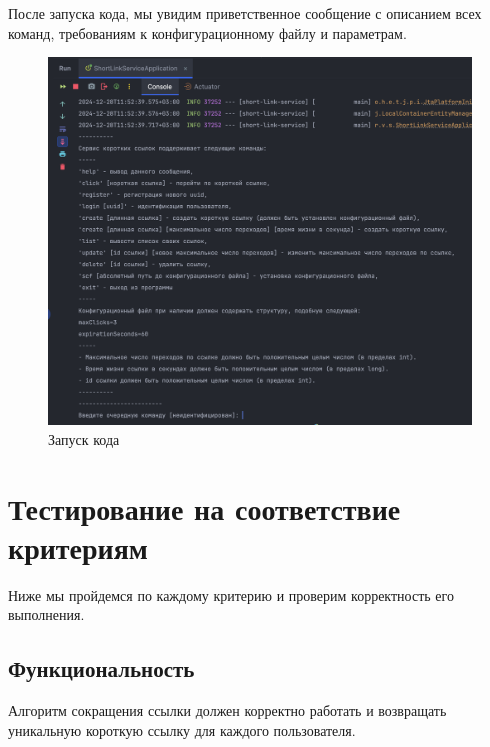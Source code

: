 \documentclass[a4paper, 14pt]{article}
\begin{document}
После запуска кода, мы увидим приветственное сообщение с описанием всех команд, требованиям к конфигурационному файлу и параметрам.


\begin{figure}[H]
	\centering
	\includegraphics[width=17cm]{resources/2.png}
	\caption{Запуск кода}
\end{figure}

\newpage
\section{Тестирование на соответствие критериям}

Ниже мы пройдемся по каждому критерию и проверим корректность его выполнения.

\subsection{Функциональность}

Алгоритм сокращения ссылки должен корректно работать и возвращать уникальную короткую ссылку для каждого пользователя.
\end{document}
